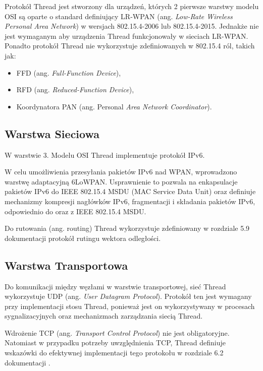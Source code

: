         Protokół Thread jest stworzony dla urządzeń, których 2 pierwsze warstwy modelu OSI są oparte o standard definiujący LR-WPAN (ang. \textit{Low-Rate Wireless Personal Area Network}) w wersjach 802.15.4-2006 lub 802.15.4-2015. Jednakże nie jest wymaganym aby urządzenia Thread funkcjonowały w sieciach LR-WPAN. Ponadto protokół Thread nie wykorzystuje zdefiniowanych w 802.15.4 ról, takich jak:
        \begin{itemize}
            \item FFD (ang. \textit{Full-Function Device}),
            \item RFD (ang. \textit{Reduced-Function Device}),
            \item Koordynatora PAN (ang. Personal \textit{Area Network Coordinator}).
        \end{itemize}

    \subsection{Warstwa Sieciowa}

        W warstwie 3. Modelu OSI Thread implementuje protokół IPv6.
        
        W celu umożliwienia przesyłania pakietów IPv6 nad WPAN, wprowadzono warstwę adaptacyjną 6LoWPAN. Usprawnienie to pozwala na enkapsulacje pakietów IPv6 do IEEE 802.15.4 MSDU (MAC Service Data Unit) oraz definiuje mechanizmy kompresji nagłówków IPv6, fragmentacji i składania pakietów IPv6, odpowiednio do oraz z IEEE 802.15.4 MSDU.
        
        Do rutowania (ang. routing) Thread wykorzystuje zdefiniowany w rozdziale 5.9 dokumentacji \cite{thread-1.3.0} protokół rutingu wektora odległości.

    \subsection{Warstwa Transportowa}
    
        Do komunikacji między węzłami w warstwie transportowej, sieć Thread wykorzystuje UDP (ang. \textit{User Datagram Protocol}). Protokół ten jest wymagany przy implementacji stosu Thread, ponieważ jest on wykorzystywany w procesach sygnalizacyjnych oraz mechanizmach zarządzania siecią Thread.
    
        Wdrożenie TCP (ang. \textit{Transport Control Protocol}) nie jest obligatoryjne. Natomiast w przypadku potrzeby uwzględnienia TCP, Thread definiuje wskazówki do efektywnej implementacji tego protokołu w rozdziale 6.2 dokumentacji \cite{thread-1.3.0}.

